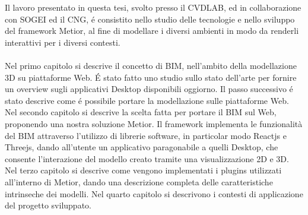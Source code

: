 
Il lavoro presentato in questa tesi, svolto presso il CVDLAB, ed in collaborazione con SOGEI ed il CNG,
 \'e consistito nello studio delle tecnologie e nello sviluppo del framework Metior,
al fine di modellare i diversi ambienti in modo da renderli interattivi per i diversi contesti.\\
\\
Nel primo capitolo si descrive il concetto di BIM,
nell'ambito della modellazione 3D su piattaforme Web. \'E stato fatto uno studio sullo stato dell'arte
per fornire un overview sugli applicativi Desktop disponibili oggiorno.
Il passo successivo \'e stato descrive come \'e possibile portare la modellazione sulle piattaforme Web.
Nel secondo capitolo si descrive la scelta fatta per portare il BIM sul Web, proponendo una nostra soluzione Metior.
Il framework implementa le funzionalit\`a del BIM attraverso l'utilizzo di librerie software,
in particolar modo Reactjs e Threejs, dando all'utente un applicativo paragonabile a quelli
Desktop, che consente l'interazione del modello creato tramite una visualizzazione 2D e 3D.
Nel terzo capitolo si descrive come vengono implementati i plugins utilizzati all'interno di Metior,
dando una descrizione completa delle caratteristiche intrinseche dei modelli.
Nel quarto capitolo si descrivono i contesti di applicazione del progetto sviluppato.
